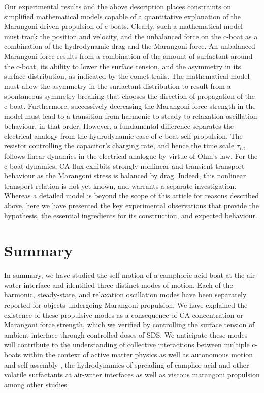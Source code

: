 \documentclass[journal=langd5, manuscript=article, layout=twocolumn]{achemso}
\begin{document}
Our experimental results and the above description places constraints on simplified mathematical models capable of a quantitative explanation of the Marangoni-driven propulsion of c-boats. Clearly, such a mathematical model must track the position and velocity, and the unbalanced force on the c-boat as a combination of the hydrodynamic drag and the Marangoni force. An unbalanced Marangoni force results from a combination of the amount of surfactant around the c-boat, its ability to lower the surface tension, and the asymmetry in its surface distribution, as indicated by the comet trails. The mathematical model must allow the asymmetry in the surfactant distribution to result from a spontaneous symmetry breaking that chooses the direction of propagation of the c-boat. Furthermore, successively decreasing the Marangoni force strength in the model must lead to a transition from harmonic to steady to relaxation-oscillation behaviour, in that order. However, a fundamental difference separates the electrical analogy from the hydrodynamic case of c-boat self-propulsion. The resistor controlling the capacitor's charging rate, and hence the time scale $\tau_C$, follows linear dynamics in the electrical analogue by virtue of Ohm's law. For the c-boat dynamics, CA flux exhibits strongly nonlinear and transient transport behaviour as the Marangoni stress is balanced by drag. Indeed, this nonlinear transport relation is not yet known, and warrants a separate investigation. Whereas a detailed model is beyond the scope of this article for reasons described above, here we have presented the key experimental observations that provide the hypothesis, the essential ingredients for its construction, and expected behaviour.

\section{Summary}
In summary, we have studied the self-motion of a camphoric acid boat at the air-water interface and identified three distinct modes of motion. Each of the harmonic, steady-state, and relaxation oscillation modes have been separately reported \cite{Hayashima2001, Suematsu2010, Jin2012, velev2012} for objects undergoing Marangoni propulsion. We have explained the existence of these propulsive modes as a consequence of CA concentration or Marangoni force strength, which we verified by controlling the surface tension of ambient interface through controlled doses of SDS. We anticipate these modes will contribute to the understanding of collective interactions between multiple c-boats within the context of active matter physics \cite{Ramaswamy2010} as well as autonomous motion and self-assembly \cite{Ismagilov2002}, the hydrodynamics of spreading of camphor acid and other volatile surfactants at air-water interfaces \cite{Troian1998} as well as viscous marangoni propulsion \cite{Lauga2012} among other studies.
\end{document}
